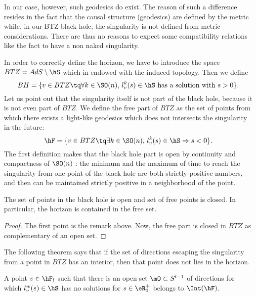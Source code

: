 In our case, however, such geodesics do exist. The reason of such a difference resides in the fact that the causal structure (geodesics) are defined by the metric while, in our BTZ black hole, the singularity is not defined from metric considerations. There are thus no reasons to expect some compatibility relations like the fact to have a non naked singularity.

In order to correctly define the horizon, we have to introduce the space $BTZ=AdS\setminus\hS$ which in endowed with the induced topology. Then we define
\begin{equation}
	BH=\{ v\in BTZ\tq\forall k\in \SO(n),\, l_v^k(s)\in\hS\text{ has a solution with $s>0$} \}.
\end{equation}
Let us point out that the singularity itself is not part of the black hole, because it is not even part of $BTZ$. We define the free part of $BTZ$ as the set of points from which there exists a light-like geodesics which does not intersects the singularity in the future:
\begin{equation}
	\hF=\{ v\in BTZ\tq\exists k\in \SO(n),\, l_v^k(s)\in\hS\Rightarrow s<0 \}.
\end{equation}
The first definition makes that the black hole part is open by continuity and compactness of $\SO(n)$ : the minimum and the maximum of time to reach the singularity from one point of the black hole are both strictly positive numbers, and then can be maintained strictly positive in a neighborhood of the point.

\begin{proposition}		\label{PropBHouvertLibreFerme}
	The set of points in the black hole is open and set of free points is closed. In particular, the horizon is contained in the free set.
\end{proposition}

\begin{proof}
	The first point is the remark above. Now, the free part is closed in $BTZ$ as complementary of an open set.	
\end{proof}

The following theorem says that if the set of directions escaping the singularity from a point in $BTZ$ has an interior, then that point does not lies in the horizon. 
\begin{proposition}		\label{PropvFOsvghorvec}
	A point $v\in\hF_l$ such that there is an open set $\mO\subset S^{l-1}$ of directions for which $l^{w}_v(s)\in\hS$ has no solutions for $s\in\eR^+_0$ belongs to $\Int(\hF)$.
\end{proposition}

